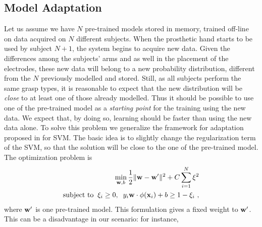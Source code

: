 \subsection{Model Adaptation}
\label{sec:adapt}

Let us assume we have $N$ pre-trained models stored in memory, trained
off-line on data acquired on $N$ different subjects. When the
prosthetic hand starts to be used by subject $N+1$, the system begins
to acquire new data. Given the differences among the subjects' arms
and as well in the placement of the electrodes, these new data will
belong to a new probability distribution, different from the $N$
previously modelled and stored. Still, as all subjects perform the
same grasp types, it is reasonable to expect that the new distribution
will be \emph{close} to at least one of those already modelled.
Thus it should be possible to use one of the pre-trained model as a
\emph{starting point} for the training using the new data.
We expect that, by doing so,  learning should be faster
than using the new data alone. 
To solve this problem we generalize the framework for adaptation proposed in
\cite{YangYH07} for SVM. 
The basic idea is to slightly change the regularization term of the
SVM, so that the solution will be close to the one of the pre-trained
model.  The optimization problem is \cite{YangYH07} %
\begin{align}
  \min_{\mathbf{w},b} \frac{1}{2} \|\mathbf{w}- \mathbf{w}'\|^2 + C \sum_{i=1}^N \xi^2 \nonumber \\
  \mbox{subject to} \;\;
  \xi_i \geq 0,\;\; y_i \mathbf{w} \cdot \phi(\mathbf{x}_i) + b \geq 1-\xi_i~,
  \label{eq:opt_prob_orig}
\end{align}
\noindent where $\mathbf{w}'$ is one pre-trained model.
This formulation gives a fixed weight to $\mathbf{w}'$. This can be a
disadvantage in our scenario: for instance,
